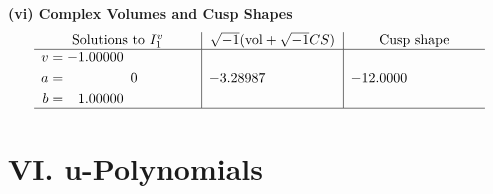 \documentclass[1p]{elsarticle_modified}
\theoremstyle{definition}
\newcommand{\I}{\sqrt{-1}}
\begin{document}
\newpage\flushleft \textbf{(vi) Complex Volumes and Cusp Shapes}
$$\begin{array}{c|c|c}  
\text{Solutions to }I^v_{1}& \I (\text{vol} + \sqrt{-1}CS) & \text{Cusp shape}\\
 \hline 
\begin{aligned}
v &= -1.00000\phantom{ +0.000000I} \\
a &= \phantom{-0.000000 } 0 \\
b &= \phantom{-}1.00000\phantom{ +0.000000I}\end{aligned}
 & -3.28987\phantom{ +0.000000I} & -12.0000\phantom{ +0.000000I}\\
 \hline 
 \end{array}$$\newpage
\newpage\renewcommand{\arraystretch}{1}
\centering \section*{ VI. u-Polynomials}
\end{document}
